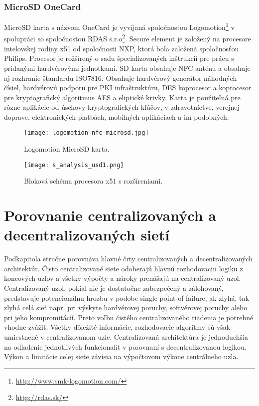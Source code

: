 \documentclass[12pt,a4paper,oneside,openright]{report}
\begin{document}
\subsubsection{MicroSD OneCard} \label{s_sd_usd}
MicroSD karta s názvom OneCard je vyvíjaná spoločnosťou Logomotion\footnote{\url{http://www.smk-logomotion.com/}} v spolupráci so spoločnosťou RDAS s.r.o\footnote{\url{http://rdas.sk/}}.
Secure element je založený na procesore intelovskej rodiny x51 od spoločnosti NXP, ktorá bola založená spoločnosťou Philips. Procesor je rožšírený o sadu špecializovaných inštrukcií pre prácu s pridanými hardvérovými jednotkami.
SD karta obsahuje NFC anténu a obsahuje aj rozhranie štandardu ISO7816. Obsahuje hardvérový generátor náhodných čísiel, hardvérovú podporu pre PKI infraštruktúru, DES koprocesor a koprocesor pre kryptografický algoritmus AES a eliptické krivky. Karta je použiteľná pre rôzne aplikácie od úschovy kryptografických kľúčov, v zdravotníctve, verejnej doprave, elektronických platbách, mobilných aplikáciach a im podobných.

\begin{figure*}[h]
	\centering
	\texttt{[image: logomotion-nfc-microsd.jpg]}
	\caption{Logomotion MicroSD karta.\cite{lgmsd}}
	\label{f:usd}
\end{figure*}

\begin{figure*}[h]
	\centering
	\texttt{[image: s\_analysis\_usd1.png]}
	\caption{Bloková schéma procesora x51 s rozšíreniami. \cite{nxpp5c}}
	\label{f:o_usd1}
\end{figure*}


\section{Porovnanie centralizovaných a decentralizovaných sietí} \label{s_centrilized_decentrilized}
Podkapitola stručne porovnáva hlavné črty centralizovaných a decentralizovaných architektúr.
Čisto centralizované siete odoberajú hlavnú rozhodovaciu logiku z koncových uzlov a všetky výpočty a nároky prenášajú na centralizovaný uzol. Centralizovaný uzol, pokiaľ nie je dostatočne zabezpečený a zálohovaný, predstavuje potencionálnu hrozbu v podobe single-point-of-failure, ak zlyhá, tak zlyhá celá sieť napr. pri výskyte hardvérovej poruchy, softvérovej poruchy alebo pri jeho kompromitácií. Preto voľbu čistého centralizovaného riadenia je potrebné vhodne zvážiť. Všetky dôležité informácie, rozhodovacie algoritmy sú však umiestnené v centralizovanom uzle.
Centralizovaná architektúra je jednoduchšia na odladenie jednotlivých funkcionalít v porovnaní s decentralizovanou logikou. Výkon a limitácie celej siete závisia na výpočtovom výkone centrálneho uzla.
\end{document}
